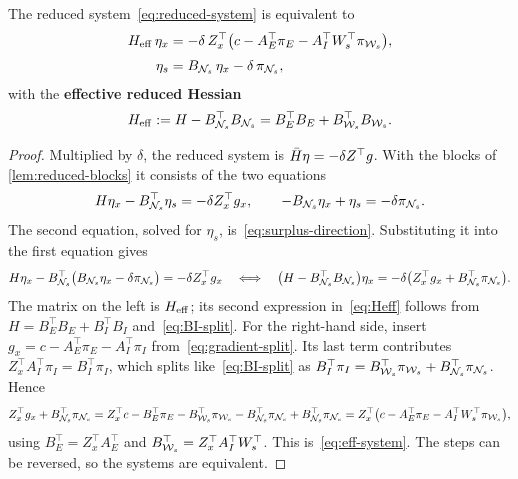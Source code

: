 \begin{theorem} \label{thm:decoupling}
The reduced system~\eqref{eq:reduced-system} is equivalent to
\begin{align}
H_{\mathrm{eff}}\,\eta_x &= -\delta\,Z_x^\top\bigl(c - A_E^\top\pi_E - A_I^\top W_s^\top\pi_{\mathcal{W}_s}\bigr),
\label{eq:eff-system}\\[3pt]
\eta_s &= B_{\mathcal{N}_s}\,\eta_x - \delta\,\pi_{\mathcal{N}_s},
\label{eq:surplus-direction}
\end{align}
with the \textbf{effective reduced Hessian}
\begin{equation} \label{eq:Heff}
H_{\mathrm{eff}} := H - B_{\mathcal{N}_s}^\top B_{\mathcal{N}_s} = B_E^\top B_E + B_{\mathcal{W}_s}^\top B_{\mathcal{W}_s} .
\end{equation}
\end{theorem}

\begin{proof}
Multiplied by $\delta$, the reduced system is $\bar{H}\eta = -\delta Z^\top g$. With the blocks
of \cref{lem:reduced-blocks} it consists of the two equations
\[
H\eta_x - B_{\mathcal{N}_s}^\top\eta_s = -\delta Z_x^\top g_x,\qquad
-B_{\mathcal{N}_s}\eta_x + \eta_s = -\delta\pi_{\mathcal{N}_s}.
\]
The second equation, solved for $\eta_s$, is~\eqref{eq:surplus-direction}. Substituting it into
the first equation gives
\[
H\eta_x - B_{\mathcal{N}_s}^\top\bigl(B_{\mathcal{N}_s}\eta_x - \delta\pi_{\mathcal{N}_s}\bigr) = -\delta Z_x^\top g_x
\quad\Longleftrightarrow\quad
\bigl(H - B_{\mathcal{N}_s}^\top B_{\mathcal{N}_s}\bigr)\eta_x = -\delta\bigl(Z_x^\top g_x + B_{\mathcal{N}_s}^\top\pi_{\mathcal{N}_s}\bigr).
\]
The matrix on the left is $H_{\mathrm{eff}}$; its second expression in~\eqref{eq:Heff} follows from
$H = B_E^\top B_E + B_I^\top B_I$ and~\eqref{eq:BI-split}. For the right-hand side, insert
$g_x = c - A_E^\top\pi_E - A_I^\top\pi_I$ from~\eqref{eq:gradient-split}. Its last term
contributes $Z_x^\top A_I^\top\pi_I = B_I^\top\pi_I$, which splits like~\eqref{eq:BI-split} as
$B_I^\top\pi_I = B_{\mathcal{W}_s}^\top\pi_{\mathcal{W}_s} + B_{\mathcal{N}_s}^\top\pi_{\mathcal{N}_s}$. Hence
\[
Z_x^\top g_x + B_{\mathcal{N}_s}^\top\pi_{\mathcal{N}_s}
= Z_x^\top c - B_E^\top\pi_E - B_{\mathcal{W}_s}^\top\pi_{\mathcal{W}_s} - B_{\mathcal{N}_s}^\top\pi_{\mathcal{N}_s} + B_{\mathcal{N}_s}^\top\pi_{\mathcal{N}_s}
= Z_x^\top\bigl(c - A_E^\top\pi_E - A_I^\top W_s^\top\pi_{\mathcal{W}_s}\bigr),
\]
using $B_E^\top = Z_x^\top A_E^\top$ and $B_{\mathcal{W}_s}^\top = Z_x^\top A_I^\top W_s^\top$. This
is~\eqref{eq:eff-system}. The steps can be reversed, so the systems are equivalent.
\end{proof}

